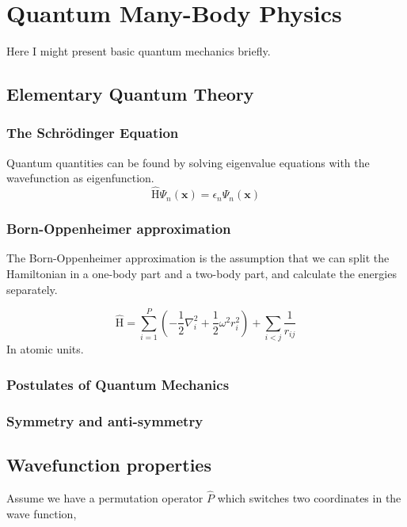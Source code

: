 \section{Quantum Many-Body Physics} \label{sec:quantum}
Here I might present basic quantum mechanics briefly.

\subsection{Elementary Quantum Theory} \label{subsec:elementary}
\subsubsection{The Schrödinger Equation} \label{subsubsec:schrodinger}
Quantum quantities can be found by solving eigenvalue equations with the wavefunction as eigenfunction. 
\begin{equation}
\label{eq:Energy}
\hat{\text{H}}\Psi_n(\boldsymbol{x})=\epsilon_n\Psi_n(\boldsymbol{x})
\end{equation}


\subsubsection{Born-Oppenheimer approximation} \label{subsubsec:bornoppenheimer}
The Born-Oppenheimer approximation is the assumption that we can split the Hamiltonian in a one-body part and a two-body part, and calculate the energies separately. 

\begin{equation}
\label{eq:Hamiltonian}
\hat{\text{H}} = \sum_{i=1}^{P} (-\frac{1}{2} \nabla_i^2 + \frac{1}{2} \omega^2 r_i ^2) + \sum_{i<j} \frac{1}{r_{ij}} 
\end{equation}
In atomic units. 

\subsubsection{Postulates of Quantum Mechanics} \label{subsubsec:postulates}

\subsubsection{Symmetry and anti-symmetry} \label{subsubsec:symmetry}

\subsection{Wavefunction properties} \label{subsec:wavefunction}
Assume we have a permutation operator $\hat{P}$ which switches two coordinates in the wave function,

